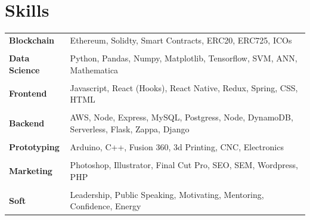 \documentclass[11pt]{article}
\begin{document}
\section*{Skills}
\begin{tabularx}{\textwidth}{lX}
  \textbf{Blockchain}   & Ethereum, Solidty, Smart Contracts, ERC20, ERC725, ICOs \\\\
  \textbf{Data Science} & Python, Pandas, Numpy, Matplotlib, Tensorflow, SVM, ANN,
                          Mathematica \\\\
  \textbf{Frontend}     & Javascript, React (Hooks), React Native, Redux, Spring, CSS, HTML  \\\\
  \textbf{Backend}      & AWS, Node, Express, MySQL, Postgress, Node, DynamoDB,
                          Serverless, Flask, Zappa, Django \\\\
  \textbf{Prototyping}  & Arduino, C++, Fusion 360, 3d Printing, CNC, Electronics \\\\
  \textbf{Marketing}    & Photoshop, Illustrator, Final Cut Pro, SEO, SEM, Wordpress, PHP \\\\
  \textbf{Soft}         & Leadership, Public Speaking, Motivating, Mentoring, Confidence, Energy
\end{tabularx}
		




\end{document}
